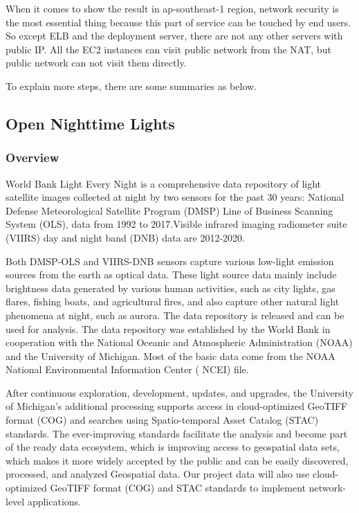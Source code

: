 \documentclass[conference]{IEEEtran}
\begin{document}
When it comes to show the result in ap-southeast-1 region, network security is the most essential thing because this part of service can be touched by end users. 
So except ELB and the deployment server, there are not any other servers with public IP. All the EC2 instances can visit public network from the NAT, but public network 
can not visit them directly.

To explain more steps, there are some summaries as below. 

\subsection{Open Nighttime Lights}

\subsubsection{Overview}
World Bank Light Every Night is a comprehensive data repository of light satellite images collected at night by 
two sensors for the past 30 years: National Defense Meteorological Satellite Program (DMSP) Line of Business Scanning 
System (OLS), data from 1992 to 2017.Visible infrared imaging radiometer suite (VIIRS) day and night band (DNB) data are 2012-2020.

Both DMSP-OLS and VIIRS-DNB sensors capture various low-light emission sources from the earth as optical data. These light source 
data mainly include brightness data generated by various human activities, such as city lights, gas flares, fishing boats, and 
agricultural fires, and also capture other natural light phenomena at night, such as aurora. The data repository is released and 
can be used for analysis. The data repository was established by the World Bank in cooperation with the National Oceanic and Atmospheric 
Administration (NOAA) and the University of Michigan. Most of the basic data come from the NOAA National Environmental Information 
Center ( NCEI) file.

After continuous exploration, development, updates, and upgrades, the University of Michigan’s additional processing supports access 
in cloud-optimized GeoTIFF format (COG) and searches using Spatio-temporal Asset Catalog (STAC) standards. The ever-improving standards 
facilitate the analysis and become part of the ready data ecosystem, which is improving access to geospatial data sets, which makes it 
more widely accepted by the public and can be easily discovered, processed, and analyzed Geospatial data. Our project data will also use 
cloud-optimized GeoTIFF format (COG) and STAC standards to implement network-level applications.
\end{document}
